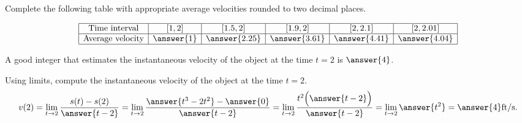 \documentclass{ximera}
\begin{document}
\begin{exercise}
\begin{exercise}
\begin{exercise}
\begin{exercise}
Complete the following table with appropriate average velocities rounded to two decimal places.

\[
\begin{array}{|c|c|c|c|c|c|}
\hline
\text{Time interval} & \left[1,2\right] & \left[1.5,2\right] & \left[1.9,2\right] & \left[2,2.1\right] & \left[2,2.01\right]\\\hline
\text{Average velocity} & \answer{1} & \answer{2.25} & \answer{3.61} & \answer{4.41} & \answer{4.04} \\\hline
\end{array}
\]

A good integer that estimates the instantaneous velocity of the object at the time $t= 2$ is $\answer{4}$.

\begin{exercise}
Using limits, compute the instantaneous velocity of the object at the time $t=2$. 
\[
v(2) =  \lim_{t\to2}\frac{s(t)-s(2)}{ \answer{t-2}} = 
 \lim_{t\to2}\frac{ \answer{t^3 - 2t^2} -\answer{0}}{\answer{t-2}} =
 \lim_{t\to2}\frac{ t^2\Bigl(\answer{t - 2}\Bigr)} {\answer{t-2}} =
 \lim_{t\to2}\answer{t^2}=\answer{4}\text{ft/s.}
\] 

\end{exercise}
\end{exercise}
\end{exercise}
\end{exercise}
\end{exercise}
\end{document}

